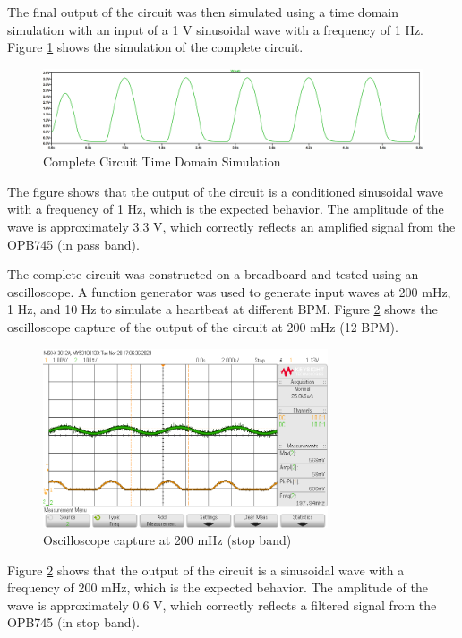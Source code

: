 \documentclass[CMPE]{KGCOEReport}
\begin{document}
The final output of the circuit was then simulated using a time domain simulation with an input of a 1 V sinusoidal wave with a frequency of 1 Hz. Figure \ref{fig:timeSim} shows the simulation of the complete circuit.

\begin{figure}[H]
    \centering
    \includegraphics[width=1\textwidth]{SimTimeOutput.png}
    \caption{Complete Circuit Time Domain Simulation}
    \label{fig:timeSim}
\end{figure}

The figure shows that the output of the circuit is a conditioned sinusoidal wave with a frequency of 1 Hz, which is the expected behavior. The amplitude of the wave is approximately 3.3 V, which correctly reflects an amplified signal from the OPB745 (in pass band).

The complete circuit was constructed on a breadboard and tested using an oscilloscope. A function generator was used to generate input waves at 200 mHz, 1 Hz, and 10 Hz to simulate a heartbeat at different BPM. Figure \ref{fig:200mHzCapture} shows the oscilloscope capture of the output of the circuit at 200 mHz (12 BPM).

\begin{figure}[H]
    \centering
    \includegraphics[width=0.75\textwidth]{200mHz.png}
    \caption{Oscilloscope capture at 200 mHz (stop band)}
    \label{fig:200mHzCapture}
\end{figure}

Figure \ref{fig:200mHzCapture} shows that the output of the circuit is a sinusoidal wave with a frequency of 200 mHz, which is the expected behavior. The amplitude of the wave is approximately 0.6 V, which correctly reflects a filtered signal from the OPB745 (in stop band).
\end{document}
